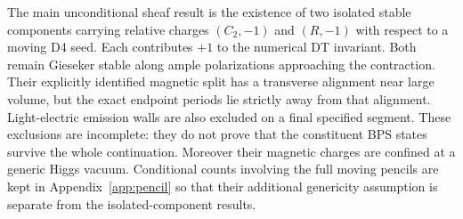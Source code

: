 The main unconditional sheaf result is the existence of two
isolated stable components carrying relative charges
$(C_2,-1)$ and $(R,-1)$ with respect to a moving D4 seed.
Each contributes $+1$ to the numerical DT invariant.
Both remain Gieseker stable along ample polarizations approaching
the contraction. Their explicitly identified magnetic split
has a transverse alignment near large volume, but the exact
endpoint periods lie strictly away from that alignment.
Light-electric emission walls are also excluded on a final
specified segment. These exclusions are incomplete: they do
not prove that the constituent BPS states survive the whole
continuation. Moreover their magnetic charges are confined at
a generic Higgs vacuum. Conditional counts involving the full
moving pencils are kept in Appendix~\ref{app:pencil} so that
their additional genericity assumption is separate from the
isolated-component results.
